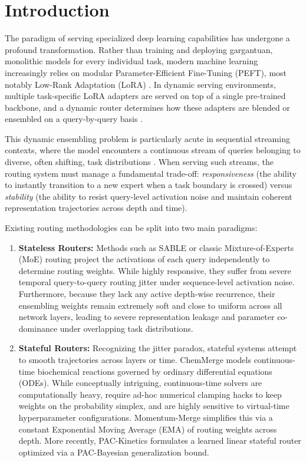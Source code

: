 \section{Introduction}
\label{sec:intro}

The paradigm of serving specialized deep learning capabilities has undergone a profound transformation. Rather than training and deploying gargantuan, monolithic models for every individual task, modern machine learning increasingly relies on modular Parameter-Efficient Fine-Tuning (PEFT), most notably Low-Rank Adaptation (LoRA) \cite{hu2021lora}. In dynamic serving environments, multiple task-specific LoRA adapters are served on top of a single pre-trained backbone, and a dynamic router determines how these adapters are blended or ensembled on a query-by-query basis \cite{sable, lora-hub, mofte}.

This dynamic ensembling problem is particularly acute in sequential streaming contexts, where the model encounters a continuous stream of queries belonging to diverse, often shifting, task distributions \cite{chemmerge, packinetics}. When serving such streams, the routing system must manage a fundamental trade-off: \emph{responsiveness} (the ability to instantly transition to a new expert when a task boundary is crossed) versus \emph{stability} (the ability to resist query-level activation noise and maintain coherent representation trajectories across depth and time).

Existing routing methodologies can be split into two main paradigms:
\begin{enumerate}
    \item \textbf{Stateless Routers:} Methods such as SABLE \cite{sable} or classic Mixture-of-Experts (MoE) routing \cite{shazeer2017outrageously, fedus2022switch} project the activations of each query independently to determine routing weights. While highly responsive, they suffer from severe temporal query-to-query routing jitter under sequence-level activation noise. Furthermore, because they lack any active depth-wise recurrence, their ensembling weights remain extremely soft and close to uniform across all network layers, leading to severe representation leakage and parameter co-dominance under overlapping task distributions.
    \item \textbf{Stateful Routers:} Recognizing the jitter paradox, stateful systems attempt to smooth trajectories across layers or time. ChemMerge \cite{chemmerge} models continuous-time biochemical reactions governed by ordinary differential equations (ODEs). While conceptually intriguing, continuous-time solvers are computationally heavy, require ad-hoc numerical clamping hacks to keep weights on the probability simplex, and are highly sensitive to virtual-time hyperparameter configurations. Momentum-Merge \cite{momentummerge} simplifies this via a constant Exponential Moving Average (EMA) of routing weights across depth. More recently, PAC-Kinetics \cite{packinetics} formulates a learned linear stateful router optimized via a PAC-Bayesian generalization bound.
\end{enumerate}

